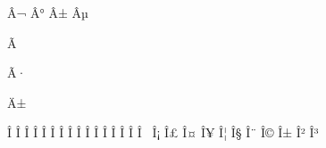 
\mubyte \neg ^^c2^^ac\endmubyte %
\mubyte \degree ^^c2^^b0\endmubyte %
\mubyte \pm ^^c2^^b1\endmubyte %
\mubyte \mu ^^c2^^b5\endmubyte %

\mubyte \times ^^c3^^97\endmubyte %

\mubyte \div ^^c3^^b7\endmubyte %

\mubyte \imath ^^c4^^b1\endmubyte %

\mubyte \Alpha ^^ce^^91\endmubyte %
\mubyte \Beta ^^ce^^92\endmubyte %
\mubyte \Gamma ^^ce^^93\endmubyte %
\mubyte \Delta ^^ce^^94\endmubyte %
\mubyte \Epsilon ^^ce^^95\endmubyte %
\mubyte \Zeta ^^ce^^96\endmubyte %
\mubyte \Eta ^^ce^^97\endmubyte %
\mubyte \Theta ^^ce^^98\endmubyte %
\mubyte \Iota ^^ce^^99\endmubyte %
\mubyte \Kappa ^^ce^^9a\endmubyte %
\mubyte \Lambda ^^ce^^9b\endmubyte %
\mubyte \Mu ^^ce^^9c\endmubyte %
\mubyte \Nu ^^ce^^9d\endmubyte %
\mubyte \Xi ^^ce^^9e\endmubyte %
\mubyte \Omicron ^^ce^^9f\endmubyte %
\mubyte \Pi ^^ce^^a0\endmubyte %
\mubyte \Rho ^^ce^^a1\endmubyte %
\mubyte \Sigma ^^ce^^a3\endmubyte %
\mubyte \Tau ^^ce^^a4\endmubyte %
\mubyte \Upsilon ^^ce^^a5\endmubyte %
\mubyte \Phi ^^ce^^a6\endmubyte %
\mubyte \Psi ^^ce^^a7\endmubyte %
\mubyte \Psi ^^ce^^a8\endmubyte %
\mubyte \Omega ^^ce^^a9\endmubyte %
\mubyte \alpha ^^ce^^b1\endmubyte %
\mubyte \beta ^^ce^^b2\endmubyte %
\mubyte \gamma ^^ce^^b3\endmubyte %
